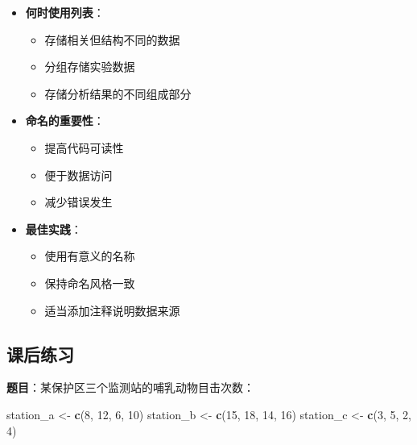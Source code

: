\documentclass[
]{book}
\newenvironment{Shaded}{\begin{snugshade}}{\end{snugshade}}
\newcommand{\DecValTok}[1]{\textcolor[rgb]{0.00,0.00,0.81}{#1}}
\newcommand{\FunctionTok}[1]{\textcolor[rgb]{0.13,0.29,0.53}{\textbf{#1}}}
\newcommand{\NormalTok}[1]{#1}
\newcommand{\OtherTok}[1]{\textcolor[rgb]{0.56,0.35,0.01}{#1}}
\providecommand{\tightlist}{%
  \setlength{\itemsep}{0pt}\setlength{\parskip}{0pt}}
\begin{document}
\begin{itemize}
\tightlist
\item
  \textbf{何时使用列表}：

  \begin{itemize}
  \tightlist
  \item
    存储相关但结构不同的数据
  \item
    分组存储实验数据
  \item
    存储分析结果的不同组成部分
  \end{itemize}
\item
  \textbf{命名的重要性}：

  \begin{itemize}
  \tightlist
  \item
    提高代码可读性
  \item
    便于数据访问
  \item
    减少错误发生
  \end{itemize}
\item
  \textbf{最佳实践}：

  \begin{itemize}
  \tightlist
  \item
    使用有意义的名称
  \item
    保持命名风格一致
  \item
    适当添加注释说明数据来源
  \end{itemize}
\end{itemize}

\hypertarget{ux8bfeux540eux7ec3ux4e60-3}{%
\subsection{课后练习}\label{ux8bfeux540eux7ec3ux4e60-3}}

\textbf{题目}：某保护区三个监测站的哺乳动物目击次数：

\begin{Shaded}
\begin{Highlighting}[]
\NormalTok{station\_a }\OtherTok{\textless{}{-}} \FunctionTok{c}\NormalTok{(}\DecValTok{8}\NormalTok{, }\DecValTok{12}\NormalTok{, }\DecValTok{6}\NormalTok{, }\DecValTok{10}\NormalTok{)}
\NormalTok{station\_b }\OtherTok{\textless{}{-}} \FunctionTok{c}\NormalTok{(}\DecValTok{15}\NormalTok{, }\DecValTok{18}\NormalTok{, }\DecValTok{14}\NormalTok{, }\DecValTok{16}\NormalTok{)}
\NormalTok{station\_c }\OtherTok{\textless{}{-}} \FunctionTok{c}\NormalTok{(}\DecValTok{3}\NormalTok{, }\DecValTok{5}\NormalTok{, }\DecValTok{2}\NormalTok{, }\DecValTok{4}\NormalTok{)}
\end{Highlighting}
\end{Shaded}
\end{document}
